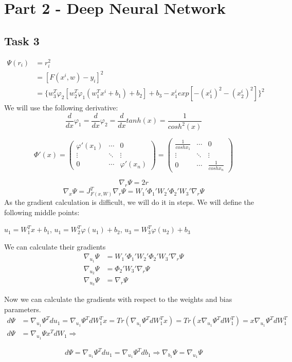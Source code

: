 \documentclass[12pt]{scrartcl}
\begin{document}
\section*{Part 2 - Deep Neural Network}
\subsection*{Task 3}
\begin{align*}
\Psi(r_i)&=r_i^2\\
&=[F(x^i,w)-y_i]^2\\
&=\{w_3^T\varphi_2[w_2^T\varphi_1(w_1^Tx^i+b_1)+b_2]+b_3 -x_1^i exp[-(x_1^i)^2-(x_2^i)^2]\}^2
\end{align*}
We will use the following derivative:
$$\frac{d}{dx}\varphi_1=\frac{d}{dx}\varphi_2=\frac{d}{dx}tanh(x)=
\frac{1}{cosh^2(x)}$$

$$\Phi'(x)=
\begin{pmatrix}
\varphi'(x_1) & \cdots & 0 \\
\vdots & \ddots & \vdots \\
0 & \cdots & \varphi'(x_n)
\end{pmatrix}
=
\begin{pmatrix}
\frac{1}{cosh x_1} & \cdots & 0 \\
\vdots & \ddots & \vdots \\
0 & \cdots & \frac{1}{cosh x_n}
\end{pmatrix}$$

$$\nabla_r \Psi = 2r$$
$$\nabla_x \Psi = J^T_{F(x, W)}\nabla_r \Psi = 
W_1'\Phi_1'W_2'\Phi_2'W_3'\nabla_r \Psi$$
As the gradient calculation is difficult, we will do it in steps. We will define the following middle points:
\begin{center}
$u_1 = W_1^Tx+b_1$, $u_1 = W_2^T\varphi(u_1)+b_2$, $u_3 = W_3^T\varphi(u_2)+b_3$
\end{center}
We can calculate their gradients
\begin{align*}
\nabla_{u_1} \Psi &= W_1'\Phi_1'W_2'\Phi_2'W_3'\nabla_r \Psi \\
\nabla_{u_2} \Psi &= \Phi_2'W_3'\nabla_r \Psi \\
\nabla_{u_3} \Psi &= \nabla_r \Psi
\end{align*}

Now we can calculate the gradients with respect to the weights and bias parameters.
\begin{align*}
d\Psi &= \nabla_{u_1}\Psi^Tdu_1=\nabla_{u_1}\Psi^T dW_1^Tx
=Tr(\nabla_{u_1}\Psi^T dW_1^Tx)=Tr(x\nabla_{u_1}\Psi^T dW_1^T)
=x\nabla_{u_1}\Psi^T dW_1^T\\
d\Psi &= \nabla_{u_1}\Psi x^TdW_1 \Rightarrow
\end{align*}
\begin{center}
\end{center}
$$d\Psi = \nabla_{u_1}\Psi^Tdu_1 = \nabla_{u_1}\Psi^T db_1 \Rightarrow \nabla_{b_1}\Psi = \nabla_{u_1} \Psi$$
\begin{center}
\end{center}
\end{document}
